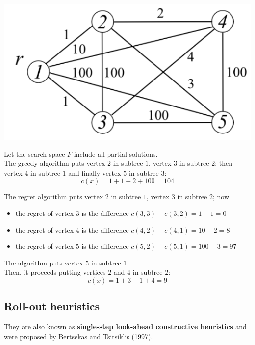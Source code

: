\documentclass[11pt]{article}
\begin{document}
	\begin{center}
		\includegraphics[width=0.5\columnwidth]{img/RBCSMTP}
	\end{center}
	
	Let the search space $F$ include all partial solutions.\\
	
	The greedy algorithm puts vertex $2$ in subtree $1$, vertex $3$ in subtree $2$; then vertex $4$ in subtree $1$ and finally vertex $5$ in subtree $3$:
	$$ c(x) = 1 + 1 + 2 + 100 = 104$$ 
	
	The regret algorithm puts vertex $2$ in subtree $1$, vertex $3$ in subtree $2$; now:
	\begin{itemize}
		\item the regret of vertex $3$ is the difference $c(3, 3) − c(3, 2) = 1 − 1 = 0$
		\item the regret of vertex $4$ is the difference $c(4, 2) − c(4, 1) = 10 − 2 = 8$
		\item the regret of vertex $5$ is the difference $c(5, 2) − c(5, 1) = 100 − 3 = 97$
	\end{itemize}
	The algorithm puts vertex $5$ in subtree $1$.\\
	Then, it proceeds putting vertices $2$ and $4$ in subtree $2$:
	$$ c(x) = 1 + 3 + 1 + 4 = 9 $$
	
	\newpage
	
	\subsection{Roll-out heuristics}
	They are also known as \textbf{single-step look-ahead constructive heuristics} and were proposed by Bertsekas and Tsitsiklis (1997).\\
	
\end{document}
